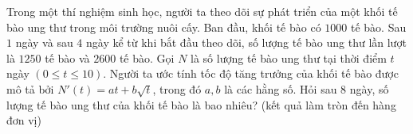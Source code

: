 \begin{ex}%
	Trong một thí nghiệm sinh học, người ta theo dõi sự phát triển của một khối tế bào ung thư trong môi trường nuôi cấy. Ban đầu, khối tế bào có $1000$ tế bào. Sau $1$ ngày và sau $4$ ngày kể từ khi bắt đầu theo dõi, số lượng tế bào ung thư lần lượt là $1250$ tế bào và $2600$ tế bào. Gọi $N$ là số lượng tế bào ung thư tại thời điểm $t$ ngày $(0\le t\le 10 )$. Người ta ước tính tốc độ tăng trưởng của khối tế bào được mô tả bởi $N'(t)=at+b\sqrt{t}$, trong đó $a, b$ là các hằng số. Hỏi sau $8$ ngày, số lượng tế bào ung thư của khối tế bào là bao nhiêu? (kết quả làm tròn đến hàng đơn vị)
	
	 \end{ex} 

